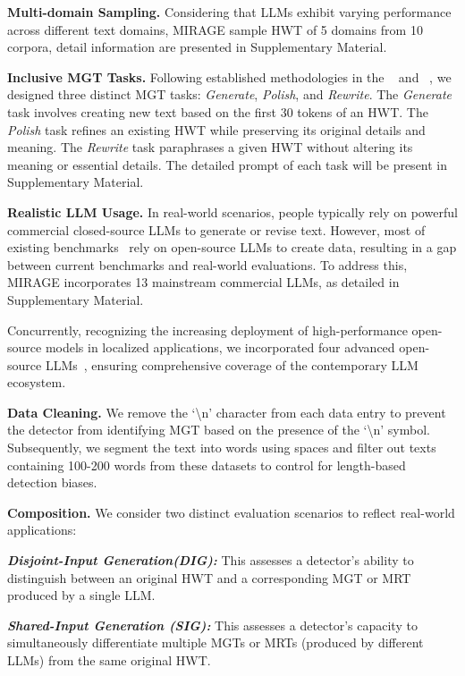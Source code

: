 \noindent \textbf{Multi-domain Sampling. }
Considering that LLMs exhibit varying performance across different text domains, MIRAGE sample HWT of 5 domains from 10 corpora, detail information are presented in Supplementary Material.

\noindent \textbf{Inclusive MGT Tasks. }
Following established methodologies in the ~\cite{fastdetectgpt} and ~\cite{imbd}, we designed three distinct MGT tasks: \textit{Generate}, \textit{Polish}, and \textit{Rewrite}.
%
The \textit{Generate} task involves creating new text based on the first 30 tokens of an HWT.
%
The \textit{Polish} task refines an existing HWT while preserving its original details and meaning.
%
The \textit{Rewrite} task paraphrases a given HWT without altering its meaning or essential details.
%
The detailed prompt of each task will be present in Supplementary Material.

\noindent \textbf{Realistic LLM Usage. }
In real-world scenarios, people typically rely on powerful commercial closed-source LLMs to generate or revise text.
%
However, most of existing benchmarks~\cite{turingbench, hc3, m4bench, mage, raid, detectrl} rely on open-source LLMs to create data, resulting in a gap between current benchmarks and real-world evaluations.
%
To address this, MIRAGE incorporates 13 mainstream commercial LLMs, as detailed in Supplementary Material.

Concurrently, recognizing the increasing deployment of high-performance open-source models in localized applications, we incorporated four advanced open-source LLMs~\cite{qwen2.5, llama3}, ensuring comprehensive coverage of the contemporary LLM ecosystem.

\noindent \textbf{Data Cleaning. }
We remove the `\textbackslash n' character from each data entry to prevent the detector from identifying MGT based on the presence of the `\textbackslash n' symbol. 
%
Subsequently, we segment the text into words using spaces and filter out texts containing 100-200 words from these datasets to control for length-based detection biases.

\noindent \textbf{Composition. }
We consider two distinct evaluation scenarios to reflect real-world applications:

\textit{\textbf{Disjoint-Input Generation(DIG):}} This assesses a detector's ability to distinguish between an original HWT and a corresponding MGT or MRT produced by a single LLM.

\textit{\textbf{Shared-Input Generation (SIG):}} This assesses a detector's capacity to simultaneously differentiate multiple MGTs or MRTs (produced by different LLMs) from the same original HWT.

